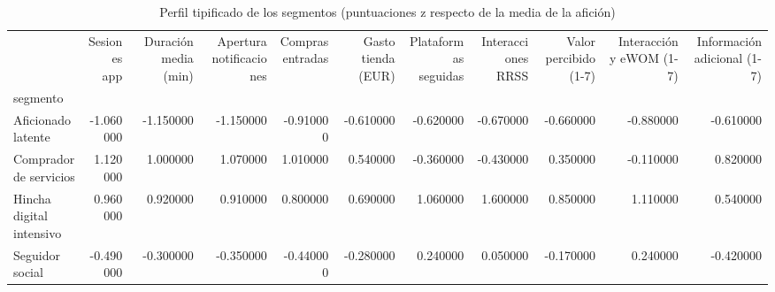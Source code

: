 \begin{table}
\caption{Perfil tipificado de los segmentos (puntuaciones z respecto de la media de la afición)}
\label{tab:perfil_segmentos_z}
\begin{tabular}{lrrrrrrrrrr}
\toprule
 & Sesiones app & Duración media (min) & Apertura notificaciones & Compras entradas & Gasto tienda (EUR) & Plataformas seguidas & Interacciones RRSS & Valor percibido (1-7) & Interacción y eWOM (1-7) & Información adicional (1-7) \\
segmento &  &  &  &  &  &  &  &  &  &  \\
\midrule
Aficionado latente & -1.060000 & -1.150000 & -1.150000 & -0.910000 & -0.610000 & -0.620000 & -0.670000 & -0.660000 & -0.880000 & -0.610000 \\
Comprador de servicios & 1.120000 & 1.000000 & 1.070000 & 1.010000 & 0.540000 & -0.360000 & -0.430000 & 0.350000 & -0.110000 & 0.820000 \\
Hincha digital intensivo & 0.960000 & 0.920000 & 0.910000 & 0.800000 & 0.690000 & 1.060000 & 1.600000 & 0.850000 & 1.110000 & 0.540000 \\
Seguidor social & -0.490000 & -0.300000 & -0.350000 & -0.440000 & -0.280000 & 0.240000 & 0.050000 & -0.170000 & 0.240000 & -0.420000 \\
\bottomrule
\end{tabular}
\end{table}
